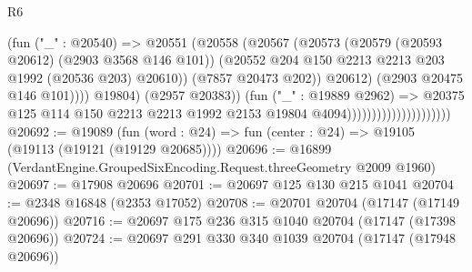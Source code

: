 \begin{lexlean}{R6}
\begin{coremodule}
                                                    (fun ("_" : @20540) =>
                                                    @20551
                                                      (@20558
                                                        (@20567
                                                          (@20573
                                                            (@20579
                                                              (@20593 @20612)
                                                              (@2903 @3568 @146 @101))
                                                            (@20552
                                                              @204
                                                              @150
                                                              @2213
                                                              @2213
                                                              @203
                                                              @1992
                                                              (@20536 @203)
                                                              @20610))
                                                          (@7857 @20473 @202))
                                                        @20612)
                                                      (@2903 @20475 @146 @101))))
                                                @19804)
                                              (@2957 @20383))
                                            (fun ("_" : @19889 @2962) =>
                                            @20375
                                              @125
                                              @114
                                              @150
                                              @2213
                                              @2213
                                              @1992
                                              @2153
                                              @19804
                                              @4094)))))))))))))))))))))
@20692 := @19089
    (fun (word : @24) => fun (center : @24) => @19105 (@19113 (@19121 (@19129 @20685))))
@20696 := @16899 (VerdantEngine.GroupedSixEncoding.Request.threeGeometry @2009 @1960)
@20697 := @17908 @20696
@20701 := @20697 @125 @130 @215 @1041
@20704 := @2348 @16848 (@2353 @17052)
@20708 := @20701 @20704 (@17147 (@17149 @20696))
@20716 := @20697 @175 @236 @315 @1040 @20704 (@17147 (@17398 @20696))
@20724 := @20697 @291 @330 @340 @1039 @20704 (@17147 (@17948 @20696))

\end{coremodule}
\end{lexlean}
